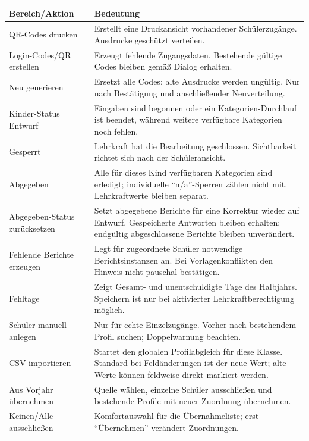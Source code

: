 \documentclass[12pt,a4paper]{article}
\begin{document}
\small
\begin{longtable}{|p{}|p{}|}
\hline
\textbf{Bereich/Aktion} & \textbf{Bedeutung}\\
\hline
QR-Codes drucken & Erstellt eine Druckansicht vorhandener Schülerzugänge. Ausdrucke geschützt verteilen.\\
\hline
Login-Codes/QR erstellen & Erzeugt fehlende Zugangsdaten. Bestehende gültige Codes bleiben gemäß Dialog erhalten.\\
\hline
Neu generieren & Ersetzt alle Codes; alte Ausdrucke werden ungültig. Nur nach Bestätigung und anschließender Neuverteilung.\\
\hline
Kinder-Status Entwurf & Eingaben sind begonnen oder ein Kategorien-Durchlauf ist beendet, während weitere verfügbare Kategorien noch fehlen.\\
\hline
Gesperrt & Lehrkraft hat die Bearbeitung geschlossen. Sichtbarkeit richtet sich nach der Schüleransicht.\\
\hline
Abgegeben & Alle für dieses Kind verfügbaren Kategorien sind erledigt; individuelle \enquote{n/a}-Sperren zählen nicht mit. Lehrkraftwerte bleiben separat.\\
\hline
Abgegeben-Status zurücksetzen & Setzt abgegebene Berichte für eine Korrektur wieder auf Entwurf. Gespeicherte Antworten bleiben erhalten; endgültig abgeschlossene Berichte bleiben unverändert.\\
\hline
Fehlende Berichte erzeugen & Legt für zugeordnete Schüler notwendige Berichtsinstanzen an. Bei Vorlagenkonflikten den Hinweis nicht pauschal bestätigen.\\
\hline
Fehltage & Zeigt Gesamt- und unentschuldigte Tage des Halbjahrs. Speichern ist nur bei aktivierter Lehrkraftberechtigung möglich.\\
\hline
Schüler manuell anlegen & Nur für echte Einzelzugänge. Vorher nach bestehendem Profil suchen; Doppelwarnung beachten.\\
\hline
CSV importieren & Startet den globalen Profilabgleich für diese Klasse. Standard bei Feldänderungen ist der neue Wert; alte Werte können feldweise direkt markiert werden.\\
\hline
Aus Vorjahr übernehmen & Quelle wählen, einzelne Schüler ausschließen und bestehende Profile mit neuer Zuordnung übernehmen.\\
\hline
Keinen/Alle ausschließen & Komfortauswahl für die Übernahmeliste; erst \enquote{Übernehmen} verändert Zuordnungen.\\
\hline
\end{longtable}
\normalsize
\end{document}

